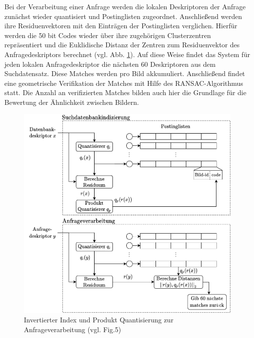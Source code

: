 Bei der Verarbeitung einer Anfrage werden die lokalen Deskriptoren der Anfrage zunächst wieder quantisiert und Postinglisten zugeordnet. Anschließend werden ihre Residuenvektoren mit den Einträgen der Postinglisten verglichen. Hierfür werden die 50 bit Codes wieder über ihre zugehörigen Clusterzentren repräsentiert und die Euklidische Distanz der Zentren zum Residuenvektor des Anfragedeskriptors berechnet (vgl. Abb. \ref{inv_ind}). Auf diese Weise findet das System für jeden lokalen Anfragedeskriptor die nächsten 60 Deskriptoren aus dem Suchdatensatz. Diese Matches werden pro Bild akkumuliert. Anschließend findet eine geometrische Verifikation der Matches mit Hilfe des RANSAC-Algorithmus statt. Die Anzahl an verifizierten Matches bilden auch hier die Grundlage für die Bewertung der Ähnlichkeit zwischen Bildern.
\begin{figure}[h]
\centering
\includegraphics[scale=0.87]{inv_ind.pdf}
\caption{Invertierter Index und Produkt Quantisierung zur Anfrageverarbeitung (vgl. \cite{pq} Fig.5)}
\label{inv_ind}
\end{figure}